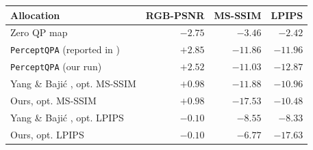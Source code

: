 \begin{tabular}{lrrr}
\toprule
Allocation & RGB-PSNR & MS-SSIM & LPIPS \\
\midrule
Zero QP map \cite{yang2025bit} & $\mathbf{-2.75}$ & $-3.46$ & $-2.42$ \\
\texttt{PerceptQPA} (reported in \cite{yang2025bit}) & $+2.85$ & $-11.86$ & $-11.96$ \\
\texttt{PerceptQPA} (our run) & $+2.52$ & $-11.03$ & $-12.87$ \\
\midrule
\rowcolor{pairms}Yang \& Baji\'c \cite{yang2025bit}, opt. MS-SSIM & $+0.98$ & $-11.88$ & $-10.96$ \\
\rowcolor{pairms}Ours, opt. MS-SSIM & $+0.98$ & $\mathbf{-17.53}$ & $-10.48$ \\
\rowcolor{pairlp}Yang \& Baji\'c \cite{yang2025bit}, opt. LPIPS & $-0.10$ & $-8.55$ & $-8.33$ \\
\rowcolor{pairlp}Ours, opt. LPIPS & $-0.10$ & $-6.77$ & $\mathbf{-17.63}$ \\
\bottomrule
\end{tabular}
